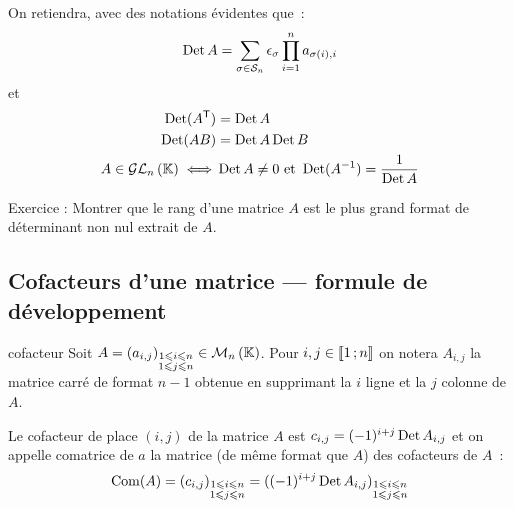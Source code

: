 On retiendra, avec des notations évidentes que~:
\begin{equation}
	\operatorname{Det} A = \sum_{\sigma \in \mathcal{S}_n} \epsilon_\sigma \prod_{i=1}^{n} a_{\sigma(i),i}
\end{equation}
et
\begin{align}
	\operatorname{Det}(A^{\mathsf{T}}) &= \operatorname{Det} A \\
	\operatorname{Det}(AB) &= \operatorname{Det} A \operatorname{Det} B\\
	A \in \mathcal{GL}_{n}\left(\mathbb{K}\right) \iff& \operatorname{Det} A \neq 0 \ \text{et} \ \operatorname{Det}(A^{-1}) = \frac{1}{\operatorname{Det} A} 
\end{align}

Exercice : Montrer que le rang d'une matrice $A$ est le plus grand format de déterminant non nul extrait de $A$.

\subsection{Cofacteurs d'une matrice --- formule de développement}
\begin{defdef}{cofacteur}
	Soit $A = (a_{i,j})_{\substack{1\leqslant i \leqslant n \\ 1 \leqslant j \leqslant n}} \in \mathcal{M}_{n}\left(\mathbb{K}\right)$. Pour $i, j \in \mathopen{\llbracket}1\mathclose{}\mathpunct{};n\mathclose{\rrbracket}$ on notera $A_{i,j}$ la matrice carré de format $n-1$ obtenue en supprimant la $i$\ieme{} ligne et la $j$\ieme{} colonne de $A$.
	
	Le cofacteur de place $(i,j)$ de la matrice $A$ est $c_{i,j} = (-1)^{i+j} \operatorname{Det} A_{i,j}$ et on appelle comatrice de $a$ la matrice (de même format que $A$) des cofacteurs de $A$~:
	\begin{equation}
		\operatorname{Com}(A) = (c_{i,j})_{\substack{1\leqslant i \leqslant n \\ 1 \leqslant j \leqslant n}} = ((-1)^{i+j} \operatorname{Det} A_{i,j})_{\substack{1\leqslant i \leqslant n \\ 1 \leqslant j \leqslant n}}
	\end{equation}
\end{defdef}

